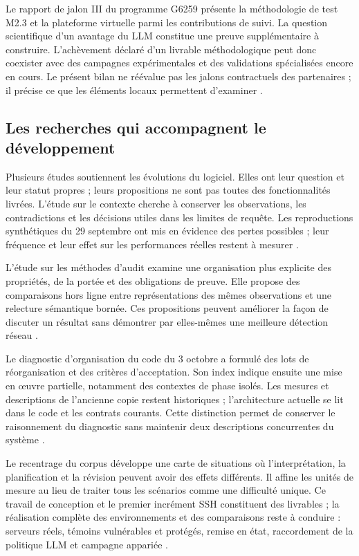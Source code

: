 \documentclass[11pt,a4paper]{article}
\begin{document}
Le rapport de jalon III du programme G6259 présente la méthodologie de test
M2.3 et la plateforme virtuelle parmi les contributions de suivi. La question
scientifique d'un avantage du LLM constitue une preuve supplémentaire à
construire. L'achèvement déclaré d'un livrable méthodologique peut donc
coexister avec des campagnes expérimentales et des validations spécialisées
encore en cours. Le présent bilan ne réévalue pas les jalons contractuels des
partenaires ; il précise ce que les éléments locaux permettent d'examiner
\cite{intro-milestone}.

\subsection{Les recherches qui accompagnent le développement}
Plusieurs études soutiennent les évolutions du logiciel. Elles ont leur
question et leur statut propres ; leurs propositions ne sont pas toutes des
fonctionnalités livrées. L'étude sur le contexte cherche à conserver les
observations, les contradictions et les décisions utiles dans les limites de
requête. Les reproductions synthétiques du 29 septembre ont mis en évidence
des pertes possibles ; leur fréquence et leur effet sur les performances
réelles restent à mesurer \cite{syn-context}.

L'étude sur les méthodes d'audit examine une organisation plus explicite des
propriétés, de la portée et des obligations de preuve. Elle propose des
comparaisons hors ligne entre représentations des mêmes observations et une
relecture sémantique bornée. Ces propositions peuvent améliorer la façon de
discuter un résultat sans démontrer par elles-mêmes une meilleure détection
réseau \cite{syn-methodes}.

Le diagnostic d'organisation du code du 3 octobre a formulé des lots de
réorganisation et des critères d'acceptation. Son index indique ensuite une
mise en œuvre partielle, notamment des contextes de phase isolés. Les mesures
et descriptions de l'ancienne copie restent historiques ; l'architecture
actuelle se lit dans le code et les contrats courants. Cette distinction
permet de conserver le raisonnement du diagnostic sans maintenir deux
descriptions concurrentes du système \cite{syn-organisation}.

Le recentrage du corpus développe une carte de situations où l'interprétation,
la planification et la révision peuvent avoir des effets différents. Il affine
les unités de mesure au lieu de traiter tous les scénarios comme une difficulté
unique. Ce travail de conception et le premier incrément SSH constituent des
livrables ; la réalisation complète des environnements et des comparaisons
reste à conduire : serveurs réels, témoins vulnérables et protégés, remise
en état, raccordement de la politique LLM et campagne appariée \cite{bench-v2}.
\end{document}
